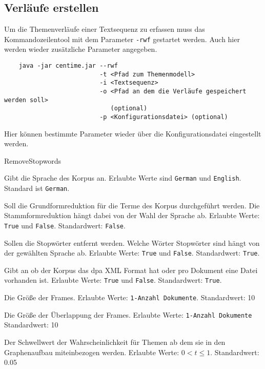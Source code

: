 	\subsection*{Verläufe erstellen}
	Um die Themenverläufe einer Textsequenz zu erfassen muss das Kommandozeilentool mit dem Parameter \texttt{-rwf} gestartet 	werden. Auch hier werden wieder zusätzliche Parameter angegeben. 
	
	\begin{verbatim}
	java -jar centime.jar --rwf
	                      -t <Pfad zum Themenmodell>
	                      -i <Textsequenz> 
	                      -o <Pfad an dem die Verläufe gespeichert werden soll> 
	                      	 (optional)
	                      -p <Konfigurationsdatei> (optional)
	\end{verbatim}
	
	Hier können bestimmte Parameter wieder über die Konfigurationsdatei eingestellt werden.	
	\begin{labeling}[]{RemoveStopwords}
		\item[\texttt{Language}] Gibt die Sprache des Korpus an. Erlaubte Werte sind \texttt{German} und \texttt{English}. 										Standard ist \texttt{German}.
		\item[\texttt{UseStemming}] Soll die Grundformreduktion für die Terme des Korpus durchgeführt werden. Die 													Stammformreduktion hängt dabei von der Wahl der Sprache ab. Erlaubte Werte: \texttt{True} 									und \texttt{False}. Standardwert: \texttt{False}. 
		\item[\texttt{RemoveStopwords}] Sollen die Stopwörter entfernt werden. Welche Wörter Stopwörter sind hängt von der 												gewählten Sprache ab. Erlaubte Werte: \texttt{True} und \texttt{False}. Standardwert: 										\texttt{True}. 
		\item[\texttt{IsCorpusDPA}] Gibt an ob der Korpus das dpa XML Format hat oder pro Dokument eine Datei vorhanden ist. 										Erlaubte Werte: \texttt{True} und \texttt{False}. Standardwert: \texttt{True}. 
		\item[\texttt{FrameSize}] Die Größe der Frames. Erlaubte Werte: \texttt{1-Anzahl Dokumente}. Standardwert: 10
		\item[\texttt{Increment}] Die Größe der Überlappung der Frames. Erlaubte Werte: \texttt{1-Anzahl Dokumente}  											  Standardwert: 10
		\item[\texttt{Threshold}] Der Schwellwert der Wahrscheinlichkeit für Themen ab dem sie in den Graphenaufbau 											miteinbezogen werden. Erlaubte Werte: $0 < t \leq 1$. Standardwert: 0.05
	\end{labeling}	


